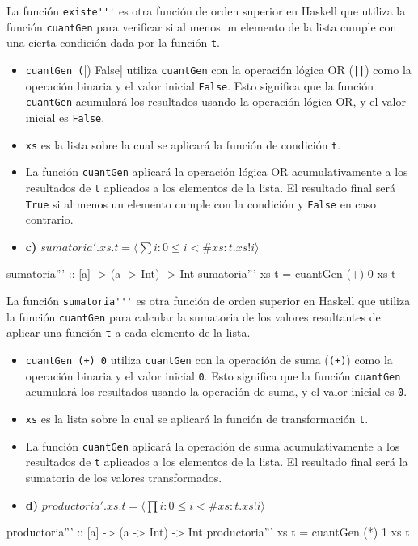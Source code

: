 \documentclass{article}
\begin{document}
    La función \verb|existe'''| es otra función de orden superior en Haskell que utiliza la función \verb|cuantGen| para verificar si al menos un elemento de la lista cumple con una cierta condición dada por la función \verb|t|.
    \begin{itemize}
    \item 
    \verb|cuantGen (||) False| utiliza \verb|cuantGen| con la operación lógica OR (\verb/||/) como la operación binaria y el valor inicial \verb|False|. Esto significa que la función \verb|cuantGen| acumulará los resultados usando la operación lógica OR, y el valor inicial es \verb|False|.
    \item 
    \verb|xs| es la lista sobre la cual se aplicará la función de condición \verb|t|.
    \item 
    La función \verb|cuantGen| aplicará la operación lógica OR acumulativamente a los resultados de \verb|t| aplicados a los elementos de la lista. El resultado final será \verb|True| si al menos un elemento cumple con la condición y \verb|False| en caso contrario.
\end{itemize}
\begin{itemize}
    \item 
    \textbf{c)} $sumatoria'.xs.t = \langle \sum i : 0 \leq i < \#xs : t.xs!i \rangle $
    \end{itemize}
    \begin{haskell}
    sumatoria''' :: [a] -> (a -> Int) -> Int
    sumatoria''' xs t = cuantGen (+) 0 xs t
    \end{haskell}
    
    La función \verb|sumatoria'''| es otra función de orden superior en Haskell que utiliza la función \verb|cuantGen| para calcular la sumatoria de los valores resultantes de aplicar una función \verb|t| a cada elemento de la lista.
    \begin{itemize}
    \item 
    \verb|cuantGen (+) 0| utiliza \verb|cuantGen| con la operación de suma (\verb|(+)|) como la operación binaria y el valor inicial \verb|0|. Esto significa que la función \verb|cuantGen| acumulará los resultados usando la operación de suma, y el valor inicial es \verb|0|.
    \item 
    \verb|xs| es la lista sobre la cual se aplicará la función de transformación \verb|t|.
    \item 
    La función \verb|cuantGen| aplicará la operación de suma acumulativamente a los resultados de \verb|t| aplicados a los elementos de la lista. El resultado final será la sumatoria de los valores transformados.
\end{itemize}
\begin{itemize}
    \item 
    \textbf{d)} $productoria'.xs.t = \langle \prod i : 0 \leq i < \#xs : t.xs!i  \rangle $
    \end{itemize}
    \begin{haskell}
    productoria''' :: [a] -> (a -> Int) -> Int
    productoria''' xs t = cuantGen (*) 1 xs t
    \end{haskell}
    
\end{document}
